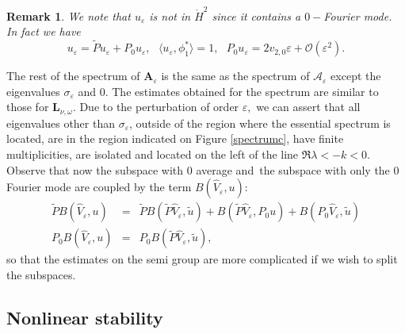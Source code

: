 \documentclass[11pt]{article}
\newtheorem{remark}[theorem]{Remark}
\begin{document}
\begin{remark}
We note that $u_{\varepsilon }$ is not in $\mathring{H}^{2}$ since it
contains a $0-$Fourier mode. In fact we have
\begin{equation*}
u_{\varepsilon }=\widetilde{P}u_{\varepsilon }+P_{0}u_{\varepsilon },\text{ }%
\langle u_{\varepsilon },\phi _{1}^{\ast }\rangle =1,\text{ }%
P_{0}u_{\varepsilon }=2v_{2,0}\varepsilon +\mathcal{O}(\varepsilon ^{2}).
\end{equation*}
\end{remark}

The rest of the spectrum of $\boldsymbol{A}_{\varepsilon }$ is the same as
the spectrum of $\mathcal{A}_\varepsilon$ except the eigenvalues $\sigma _{\varepsilon }$ and $0.$ The
estimates obtained for the spectrum are similar to those for $\boldsymbol{L}%
_{\nu ,\omega }$.  Due to the perturbation of
order $\varepsilon ,$ we can assert that all eigenvalues other than $\sigma
_{\varepsilon }$, outside of the region where the essential spectrum is
located, are in the region indicated on Figure \ref{spectrumc}, have finite
multiplicities, are isolated and located on the left of the line $\Re
\lambda <-k<0.$ Observe that now the subspace with $0$ average and\ the
subspace with only the $0$ Fourier mode are coupled by the term $B(%
\widehat{V}_{\varepsilon },u)$: 
\begin{eqnarray*}
\widetilde{P}B(\widehat{V}_{\varepsilon },u) &=&\widetilde{P}B(\widetilde{P}%
\widehat{V}_{\varepsilon },\widetilde{u})+B(\widetilde{P}\widehat{V}%
_{\varepsilon },P_{0}u)+B(P_{0}\widehat{V}_{\varepsilon },\widetilde{u}) \\
P_{0}B(\widehat{V}_{\varepsilon },u) &=&P_{0}B(\widetilde{P}\widehat{V}%
_{\varepsilon },\widetilde{u}),
\end{eqnarray*}%
so that the estimates on the semi group are more complicated if we wish to
split the subspaces.



\subsection{Nonlinear stability}

\end{document}
